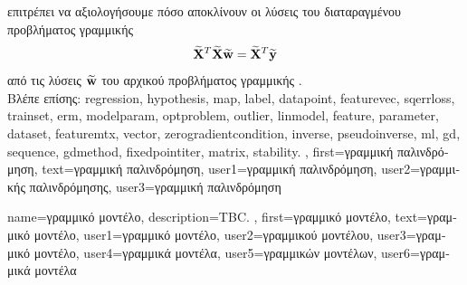 {{{		επιτρέπει να αξιολογήσουμε πόσο αποκλίνουν οι λύσεις του διαταραγμένου προβλήματος γραμμικής}  
		\cite[\foreignlanguage{greek}{Ενότητα}\ 2.6]{GolubVanLoanBook}
		$$\widetilde{{\bf X}}^{T} \widetilde{{\bf X}} \widetilde{{\bf w}} = 
		\widetilde{{\bf X}}^{T} \widetilde{{\bf y}}$$
		\foreignlanguage{greek}{από τις λύσεις $\widetilde{{\bf w}}$ του αρχικού προβλήματος γραμμικής} .
		\\
		\foreignlanguage{greek}{Βλέπε επίσης:} \gls{regression}, \gls{hypothesis}, \gls{map}, \gls{label}, \gls{datapoint}, \gls{featurevec}, 
		\gls{sqerrloss}, \gls{trainset}, \gls{erm}, \gls{modelparam}, \gls{optproblem}, \gls{outlier}, \gls{linmodel}, \gls{feature}, \gls{parameter}, 
		\gls{dataset}, \gls{featuremtx}, \gls{vector}, \gls{zerogradientcondition}, \gls{inverse}, \gls{pseudoinverse}, \gls{ml}, \gls{gd}, \gls{sequence}, 
		\gls{gdmethod}, \gls{fixedpointiter}, \gls{matrix}, \gls{stability}. },
	first={\foreignlanguage{greek}{γραμμική παλινδρόμηση}},
	text={\foreignlanguage{greek}{γραμμική παλινδρόμηση}},
	user1={\foreignlanguage{greek}{γραμμική παλινδρόμηση}}, %
	user2={\foreignlanguage{greek}{γραμμικής παλινδρόμησης}}, %
	user3={\foreignlanguage{greek}{γραμμική παλινδρόμηση}} %
}

{name={\foreignlanguage{greek}{γραμμικό μοντέλο}},
	description={TBC. }, 
	first={\foreignlanguage{greek}{γραμμικό μοντέλο}},
   	text={\foreignlanguage{greek}{γραμμικό μοντέλο}},
   	user1={\foreignlanguage{greek}{γραμμικό μοντέλο}}, %
   	user2={\foreignlanguage{greek}{γραμμικού μοντέλου}}, %
   	user3={\foreignlanguage{greek}{γραμμικό μοντέλο}}, %
   	user4={\foreignlanguage{greek}{γραμμικά μοντέλα}}, %
   	user5={\foreignlanguage{greek}{γραμμικών μοντέλων}}, %
   	user6={\foreignlanguage{greek}{γραμμικά μοντέλα}} %
}

